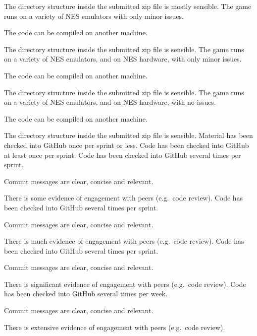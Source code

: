 \documentclass{../../fal_assignment}
\begin{document}
\begin{markingrubric}
            \par The directory structure inside the submitted zip file is mostly sensible.
        \grade The game runs on a variety of NES emulators with only minor issues.
        	\par The code can be compiled on another machine.
            \par The directory structure inside the submitted zip file is sensible.
        \grade The game runs on a variety of NES emulators, and on NES hardware, with only minor issues.
        	\par The code can be compiled on another machine.
            \par The directory structure inside the submitted zip file is sensible.
        \grade The game runs on a variety of NES emulators, and on NES hardware, with no issues.
        	\par The code can be compiled on another machine.
            \par The directory structure inside the submitted zip file is sensible.
%
        \grade \fail Material has been checked into GitHub once per sprint or less.
        \grade Code has been checked into GitHub at least once per sprint.
        \grade Code has been checked into GitHub several times per sprint.
            \par Commit messages are clear, concise and relevant.
            \par There is some evidence of engagement with peers (e.g.\ code review).
        \grade Code has been checked into GitHub several times per sprint.
            \par Commit messages are clear, concise and relevant.
            \par There is much evidence of engagement with peers (e.g.\ code review).
        \grade Code has been checked into GitHub several times per sprint.
            \par Commit messages are clear, concise and relevant.
            \par There is significant evidence of engagement with peers (e.g.\ code review).
        \grade Code has been checked into GitHub several times per week.
            \par Commit messages are clear, concise and relevant.
            \par There is extensive evidence of engagement with peers (e.g.\ code review).
\end{markingrubric}
\end{document}
